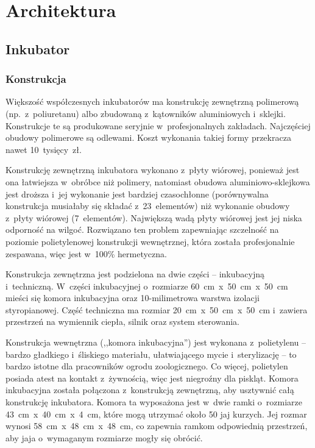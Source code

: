 
\chapter{Architektura}
\label{sec:Architektura}

\section{Inkubator}

\subsection{Konstrukcja}
Większość współczesnych inkubatorów ma konstrukcję zewnętrzną polimerową
(np.~z~poliuretanu) albo zbudowaną z~kątowników aluminiowych i~sklejki.
Konstrukcje te są produkowane seryjnie w~profesjonalnych zakładach.
Najczęściej obudowy polimerowe są odlewami. Koszt wykonania takiej formy przekracza
nawet 10~tysięcy~zł. 

Konstrukcję zewnętrzną inkubatora wykonano z~płyty wiórowej, ponieważ jest ona
łatwiejsza w~obróbce niż polimery, natomiast obudowa aluminiowo-sklejkowa jest
droższa i~jej wykonanie jest bardziej czasochłonne (porównywalna konstrukcja
musiałaby się składać z~23~elementów) niż wykonanie obudowy z~płyty wiórowej (7~elementów).
Największą wadą płyty wiórowej jest jej niska odporność na wilgoć. Rozwiązano
ten problem zapewniając szczelność na poziomie polietylenowej konstrukcji
wewnętrznej, która została profesjonalnie zespawana, więc jest w~100\%
hermetyczna. 

Konstrukcja zewnętrzna jest podzielona na dwie części -- inkubacyjną i~techniczną.
W~części inkubacyjnej o~rozmiarze 60~cm~x~50~cm~x~50~cm mieści się
komora inkubacyjna oraz 10-milimetrowa warstwa izolacji styropianowej.
Część techniczna ma rozmiar 20~cm~x~50~cm~x~50~cm i~zawiera przestrzeń na wymiennik
ciepła, silnik oraz system sterowania. 

Konstrukcja wewnętrzna (,,komora inkubacyjna'') jest wykonana z~polietylenu --
bardzo gładkiego i~śliskiego materiału, ułatwiającego mycie i~sterylizację -- to
bardzo istotne dla pracowników ogrodu zoologicznego. Co więcej, polietylen posiada atest na
kontakt z~żywnością, więc jest niegroźny dla piskląt. Komora inkubacyjna
została połączona z~konstrukcją zewnętrzną, aby usztywnić całą konstrukcję
inkubatora. Komora ta wyposażona jest w~dwie ramki o~rozmiarze
43~cm~x~40~cm~x~4~cm, które mogą utrzymać około 50 jaj kurzych. Jej rozmar wynosi 58~cm~x~48~cm~x~48~cm, co zapewnia ramkom odpowiednią przestrzeń, aby
jaja o~wymaganym rozmiarze mogły się obrócić.

